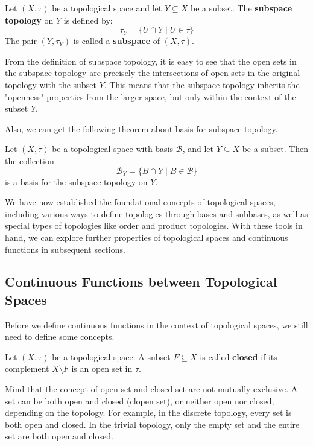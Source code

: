 \begin{definition}
Let $(X, \tau)$ be a topological space and let $Y \subseteq X$ be a subset. The \textbf{subspace topology} on $Y$ is defined by:
\[\tau_Y = \{ U \cap Y \mid U \in \tau \} \]
The pair $(Y, \tau_Y)$ is called a \textbf{subspace} of $(X, \tau)$.
\end{definition}

From the definition of subspace topology, it is easy to see that the open sets in the subspace topology are precisely the intersections of open sets in the original topology with the subset $Y$. This means that the subspace topology inherits the "openness" properties from the larger space, but only within the context of the subset $Y$.

Also, we can get the following theorem about basis for subspace topology.

\begin{theorem}
Let $(X, \tau)$ be a topological space with basis $\mathcal{B}$, and let $Y \subseteq X$ be a subset. Then the collection
\[\mathcal{B}_Y = \{ B \cap Y \mid B \in \mathcal{B} \} \]
is a basis for the subspace topology on $Y$.
\end{theorem}

We have now established the foundational concepts of topological spaces, including various ways to define topologies through bases and subbases, as well as special types of topologies like order and product topologies. With these tools in hand, we can explore further properties of topological spaces and continuous functions in subsequent sections.

\subsection{Continuous Functions between Topological Spaces}

Before we define continuous functions in the context of topological spaces, we still need to define some concepts.

\begin{definition}
Let $(X, \tau)$ be a topological space. A subset $F \subseteq X$ is called \textbf{closed} if its complement $X \setminus F$ is an open set in $\tau$.
\end{definition}

\begin{remark}
Mind that the concept of open set and closed set are not mutually exclusive. A set can be both open and closed (clopen set), or neither open nor closed, depending on the topology. For example, in the discrete topology, every set is both open and closed. In the trivial topology, only the empty set and the entire set are both open and closed.
\end{remark}



















